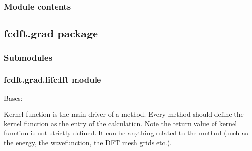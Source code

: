 \documentclass[letterpaper,10pt,english]{sphinxmanual}
\begin{document}
\subsubsection{Module contents}
\label{\detokenize{fcdft.dft:module-fcdft.dft}}\label{\detokenize{fcdft.dft:module-contents}}
\sphinxstepscope


\subsection{fcdft.grad package}
\label{\detokenize{fcdft.grad:fcdft-grad-package}}\label{\detokenize{fcdft.grad::doc}}

\subsubsection{Submodules}
\label{\detokenize{fcdft.grad:submodules}}

\subsubsection{fcdft.grad.lifcdft module}
\label{\detokenize{fcdft.grad:module-fcdft.grad.lifcdft}}\label{\detokenize{fcdft.grad:fcdft-grad-lifcdft-module}}

\begin{fulllineitems}
\label{\detokenize{fcdft.grad:fcdft.grad.lifcdft.Gradients}}
\pysigstartsignatures
\pysiglinewithargsret
{}
{}
{}
\pysigstopsignatures
\sphinxAtStartPar
Bases: 

\begin{fulllineitems}
\label{\detokenize{fcdft.grad:fcdft.grad.lifcdft.Gradients.kernel}}
\pysigstartsignatures
\pysiglinewithargsret
{}
{}
{}
\pysigstopsignatures
\sphinxAtStartPar
Kernel function is the main driver of a method.  Every method should
define the kernel function as the entry of the calculation.  Note the
return value of kernel function is not strictly defined.  It can be
anything related to the method (such as the energy, the wave\sphinxhyphen{}function,
the DFT mesh grids etc.).

\end{fulllineitems}


\end{fulllineitems}
\end{document}
